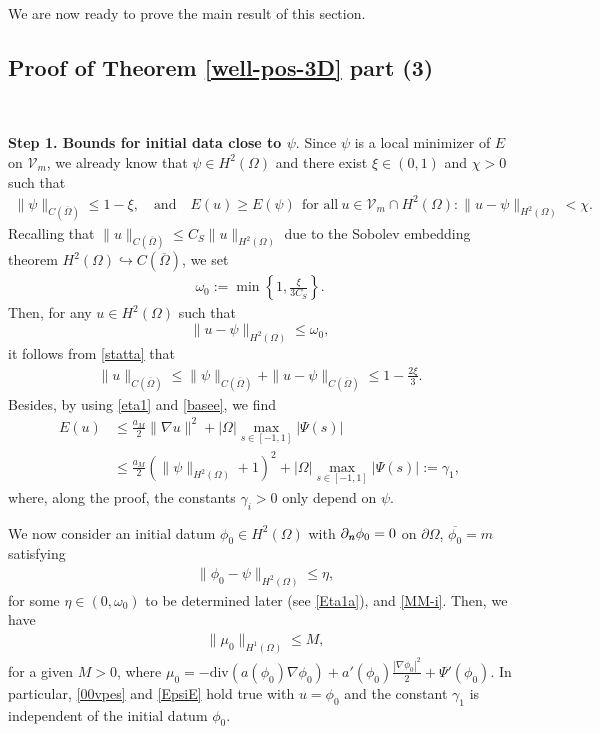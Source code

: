 \documentclass[11pt,reqno]{amsart}
\theoremstyle{remark}
\def\n{\textbf{\textit{n}}}
\def\div{\mathrm{div}}
\numberwithin{equation}{section}
\newcommand{\vp}{\phi}
\begin{document}

We are now ready to prove the main result of this section.
\subsection{Proof of Theorem \ref{well-pos-3D} part (3)}$\,$

\smallskip

\textbf{Step 1. Bounds for initial data close to $\psi$}.
Since $\psi$ is a local minimizer of $E$ on $\mathcal{V}_m$, we already know that $\psi\in H^2(\Omega)$ and there exist $\xi\in (0,1)$ and $\chi>0$ such that
\begin{align}
\|\psi\|_{C(\overline{\Omega})} \leq 1-\xi,\quad\text{and}
\quad E(u)\geq E(\psi)\ \ \text{for all}\ u\in \mathcal{V}_m\cap H^2(\Omega):
\|u-\psi\|_{H^2(\Omega)}<\chi.\label{statta}
\end{align}
Recalling that
$
\|u\|_{C(\overline{\Omega})}\leq C_S \|u\|_{H^2(\Omega)}
$
due to the Sobolev embedding theorem
$H^2(\Omega)\hookrightarrow C(\overline{\Omega})$,
we set
 \begin{align}
\omega_0:=\min\left\{1, \frac{\xi}{3C_S}\right\}.\label{eta1}
\end{align}
Then, for any $u\in H^2(\Omega)$ such that
\begin{equation}
\label{basee}\|u-\psi\|_{H^2(\Omega)}\leq \omega_0,
\end{equation}
it follows from \eqref{statta} that
\begin{align}
\|u\|_{C(\overline{\Omega})}
\leq \|\psi\|_{C(\overline{\Omega})}
+\|u-\psi\|_{C(\overline{\Omega})}
\leq 1-\frac{2\xi}{3}.\label{00vpes}
\end{align}
Besides, by using \eqref{eta1} and \eqref{basee}, we find 
\begin{align}
 E(u)&\leq \frac{a_M}{2}\|\nabla u\|^2+ |\Omega|\max_{s\in[-1,1]}|\Psi(s)|\nonumber\\
 &\leq \frac{a_M}{2}(\|\psi\|_{H^2(\Omega)}+1)^2 + |\Omega|\max_{s\in[-1,1]}|\Psi(s)|
 := \gamma_1,\label{EpsiE}
\end{align}
where, along the proof, the constants $\gamma_i>0$ only depend on $\psi$. 

We now consider an initial datum $\phi_0\in H^2(\Omega)$  with $\partial_\n \vp_0=0$ on $\partial \Omega$, $\overline{\vp_0}=m$ satisfying
\begin{align}
&\|\vp_0-\psi\|_{H^2(\Omega)}\leq \eta,\label{boundeta}
\end{align}
for some $\eta\in (0, \omega_0)$ to be determined later (see \eqref{Eta1a}), 
and \eqref{MM-i}. Then, we have 
\begin{align}
&\|\mu_0\|_{H^1(\Omega)}\leq M,\label{bound0}
\end{align}
for a given $M>0$, where
$
\mu_0= -\div( a(\phi_0) \nabla \phi_0) + a'(\phi_0) \frac{|\nabla \phi_0|^2}{2}+\Psi'(\phi_0)
$. In particular, \eqref{00vpes} and \eqref{EpsiE} hold true with $u= \phi_0$ and the constant $\gamma_1$ is independent of the initial datum $\phi_0$.
\end{document}
